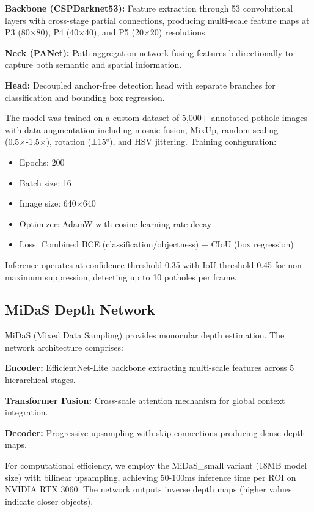 \documentclass[conference]{IEEEtran}
\begin{document}
\textbf{Backbone (CSPDarknet53):} Feature extraction through 53 convolutional layers with cross-stage partial connections, producing multi-scale feature maps at P3 (80×80), P4 (40×40), and P5 (20×20) resolutions.

\textbf{Neck (PANet):} Path aggregation network fusing features bidirectionally to capture both semantic and spatial information.

\textbf{Head:} Decoupled anchor-free detection head with separate branches for classification and bounding box regression.

The model was trained on a custom dataset of 5,000+ annotated pothole images with data augmentation including mosaic fusion, MixUp, random scaling (0.5×-1.5×), rotation (±15°), and HSV jittering. Training configuration:

\begin{itemize}
    \item Epochs: 200
    \item Batch size: 16
    \item Image size: 640×640
    \item Optimizer: AdamW with cosine learning rate decay
    \item Loss: Combined BCE (classification/objectness) + CIoU (box regression)
\end{itemize}

Inference operates at confidence threshold 0.35 with IoU threshold 0.45 for non-maximum suppression, detecting up to 10 potholes per frame.

\subsection{MiDaS Depth Network}

MiDaS (Mixed Data Sampling) \cite{midas} provides monocular depth estimation. The network architecture comprises:

\textbf{Encoder:} EfficientNet-Lite backbone extracting multi-scale features across 5 hierarchical stages.

\textbf{Transformer Fusion:} Cross-scale attention mechanism for global context integration.

\textbf{Decoder:} Progressive upsampling with skip connections producing dense depth maps.

For computational efficiency, we employ the MiDaS\_small variant (18MB model size) with bilinear upsampling, achieving 50-100ms inference time per ROI on NVIDIA RTX 3060. The network outputs inverse depth maps (higher values indicate closer objects).
\end{document}
